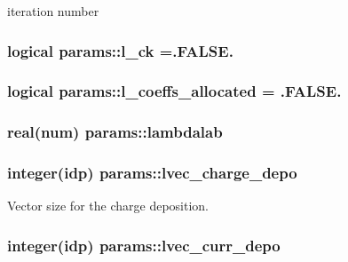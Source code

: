 iteration number 

\subsubsection[{\texorpdfstring{l\+\_\+ck}{l_ck}}]{\setlength{\rightskip}{0pt plus 5cm}logical params\+::l\+\_\+ck =.F\+A\+L\+S\+E.}\hypertarget{namespaceparams_a7e70ec0bfba23188ddeb3004e464a69b}{}\label{namespaceparams_a7e70ec0bfba23188ddeb3004e464a69b}
\subsubsection[{\texorpdfstring{l\+\_\+coeffs\+\_\+allocated}{l_coeffs_allocated}}]{\setlength{\rightskip}{0pt plus 5cm}logical params\+::l\+\_\+coeffs\+\_\+allocated = .F\+A\+L\+S\+E.}\hypertarget{namespaceparams_abbe8f0ac16d41f275328feb0a5d63fed}{}\label{namespaceparams_abbe8f0ac16d41f275328feb0a5d63fed}
\subsubsection[{\texorpdfstring{lambdalab}{lambdalab}}]{\setlength{\rightskip}{0pt plus 5cm}real(num) params\+::lambdalab}\hypertarget{namespaceparams_a24b22ed48dbf0d3d0f582e6db7d40a76}{}\label{namespaceparams_a24b22ed48dbf0d3d0f582e6db7d40a76}
\subsubsection[{\texorpdfstring{lvec\+\_\+charge\+\_\+depo}{lvec_charge_depo}}]{\setlength{\rightskip}{0pt plus 5cm}integer(idp) params\+::lvec\+\_\+charge\+\_\+depo}\hypertarget{namespaceparams_a73dceeb78f9f0abe2d39ba48e2aee2d9}{}\label{namespaceparams_a73dceeb78f9f0abe2d39ba48e2aee2d9}


Vector size for the charge deposition. 

\subsubsection[{\texorpdfstring{lvec\+\_\+curr\+\_\+depo}{lvec_curr_depo}}]{\setlength{\rightskip}{0pt plus 5cm}integer(idp) params\+::lvec\+\_\+curr\+\_\+depo}\hypertarget{namespaceparams_aedb04c2dd01619937eaad2ce0a2626a5}{}\label{namespaceparams_aedb04c2dd01619937eaad2ce0a2626a5}


